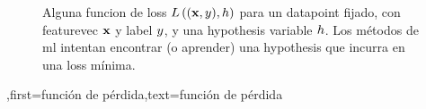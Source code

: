 {{\begin{figure}[H]
\begin{center}
			\end{center}
			\vspace*{-7mm}
			\caption{Alguna funcion de \gls{loss} $L\left(({\bf x},y),h \right)$ para un \gls{datapoint} fijado, con 
				\gls{featurevec} ${\bf x}$ y \gls{label} $y$, y una \gls{hypothesis} variable $h$. 
				Los métodos de \gls{ml} intentan encontrar (o aprender) una \gls{hypothesis} que incurra en una \gls{loss} mínima.}
			\label{fig_loss_function_gls_dict}
	\end{figure}
 },first={función de pérdida},text={función de pérdida} }

